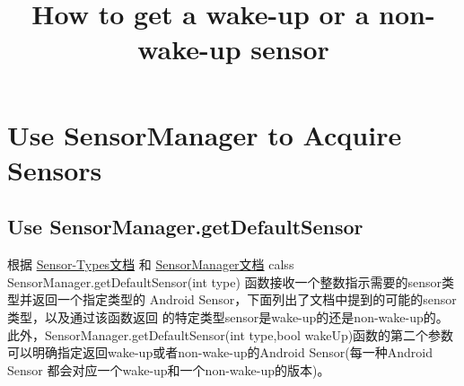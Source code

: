 \documentclass{article}
\title{How to get a wake-up or a non-wake-up sensor}
\begin{document}
\section{Use SensorManager to Acquire Sensors}
\subsection{Use SensorManager.getDefaultSensor}
根据
\href{https://source.android.com/devices/sensors/sensor-types.html}
     {Sensor-Types文档}
和
\href{https://developer.android.com/reference/android/hardware/SensorManager.html}{SensorManager文档}
calss SensorManager.getDefaultSensor(int type)
函数接收一个整数指示需要的sensor类型并返回一个指定类型的
Android Sensor，下面列出了文档中提到的可能的sensor类型，以及通过该函数返回
的特定类型sensor是wake-up的还是non-wake-up的。
此外，SensorManager.getDefaultSensor(int type,bool wakeUp)函数的第二个参数
可以明确指定返回wake-up或者non-wake-up的Android Sensor(每一种Android Sensor
都会对应一个wake-up和一个non-wake-up的版本)。
\end{document}
